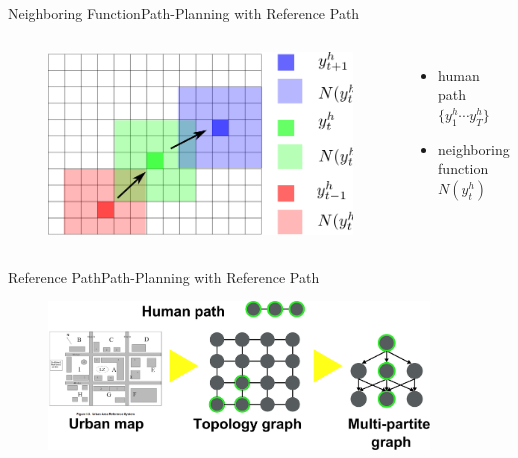 \begin{frame}{Neighboring Function}{Path-Planning with Reference Path}

\begin{columns}
\begin{minipage}[c]{\linewidth}
\begin{figure}
\centering
\includegraphics[width = \textwidth]{./figure/humanConstraint}
\end{figure}
\end{minipage}

\begin{minipage}[c]{\linewidth}
\begin{itemize}
\item { human path $ \{ y^{h}_{1} \cdots y^{h}_{T} \} $ }
\item { neighboring function $ N( y^{h}_{t} ) $ }
\end{itemize}
\end{minipage}
\end{columns}

\end{frame}

\begin{frame}{Reference Path}{Path-Planning with Reference Path}

\begin{figure}
\centering
\includegraphics[width = 0.9\textwidth]{./figure/layers}
\end{figure}

\end{frame}

